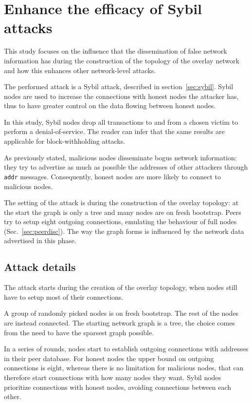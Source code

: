\chapter{Enhance the efficacy of Sybil attacks}
\label{sec:atk}
This study focuses on the influence that the dissemination of false network information has during the construction of the topology of the overlay network and how this enhances other network-level attacks.

The performed attack is a Sybil attack, described in section~\ref{sec:sybil}. Sybil nodes are used to increase the connections with honest nodes the attacker has, thus to have greater control on the data flowing between honest nodes.  

In this study, Sybil nodes drop all transactions to and from a chosen victim to perform a denial-of-service. The reader can infer that the same results are applicable for block-withholding attacks.

As previously stated, malicious nodes disseminate bogus network information: they try to advertise as much as possible the addresses of other attackers through \texttt{addr} messages. Consequently, honest nodes are more likely to connect to malicious nodes.

The setting of the attack is during the construction of the overlay topology: at the start the graph is only a tree and many nodes are on fresh bootstrap. Peers try to setup eight outgoing connections, emulating the behaviour of full nodes (Sec.~\ref{sec:peerdisc}). The way the graph forms is influenced by the network data advertised in this phase.

\section{Attack details}\label{sec:atkdetails}
The attack starts during the creation of the overlay topology, when nodes still have to setup most of their connections.

A group of randomly picked nodes is on fresh bootstrap. The rest of the nodes are instead connected. The starting network graph is a tree, the choice comes from the need to have the sparsest graph possible.

In a series of rounds, nodes start to establish outgoing connections with addresses in their peer database. For honest nodes the upper bound on outgoing connections is eight, whereas there is no limitation for malicious nodes, that can therefore start connections with how many nodes they want. Sybil nodes prioritize connections with honest nodes, avoiding connections between each other.

